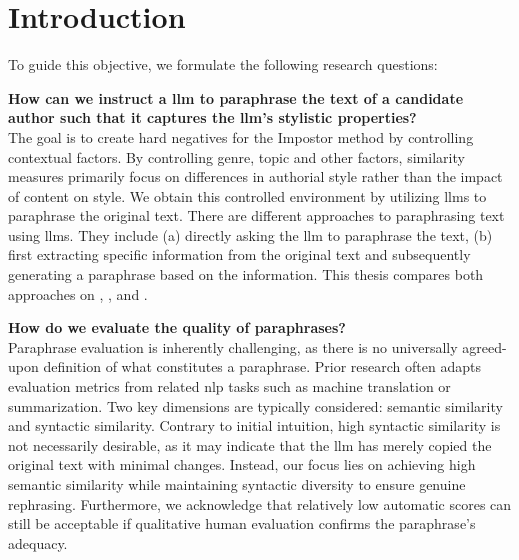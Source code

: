 \chapter{Introduction}
\label{chap:introduction}





To guide this objective, we formulate the following research questions:
\begin{questions}
    \item \textbf{How can we instruct a \ac{llm} to paraphrase the text of a candidate author such that it captures the \ac{llm}'s stylistic properties?} \label{enum:rq1} \hfill \\
    The goal is to create hard negatives for the Impostor method by controlling contextual factors.
    By controlling genre, topic and other factors, similarity measures primarily focus on differences in authorial style rather than the impact of content on style.
    We obtain this controlled environment by utilizing \acp{llm} to paraphrase the original text.
    There are different approaches to paraphrasing text using \acp{llm}.
    They include (a) directly asking the \ac{llm} to paraphrase the text, 
    (b) first extracting specific information from the original text and subsequently generating a paraphrase based on the information.
    This thesis compares both approaches on \dataStudent{}, \dataBlog{}, \dataGutenberg{} and \dataPan{}.

    \item \textbf{How do we evaluate the quality of paraphrases?} \label{enum:rq2} \hfill \\
    Paraphrase evaluation is inherently challenging, as there is no universally agreed-upon definition of what constitutes a paraphrase. 
    Prior research often adapts evaluation metrics from related \ac{nlp} tasks such as machine translation or summarization. 
    Two key dimensions are typically considered: semantic similarity and syntactic similarity.
    Contrary to initial intuition, high syntactic similarity is not necessarily desirable, as it may indicate that the \ac{llm} has merely copied the original text with minimal changes. 
    Instead, our focus lies on achieving high semantic similarity while maintaining syntactic diversity to ensure genuine rephrasing.
    Furthermore, we acknowledge that relatively low automatic scores can still be acceptable if qualitative human evaluation confirms the paraphrase’s adequacy.


\end{questions}
